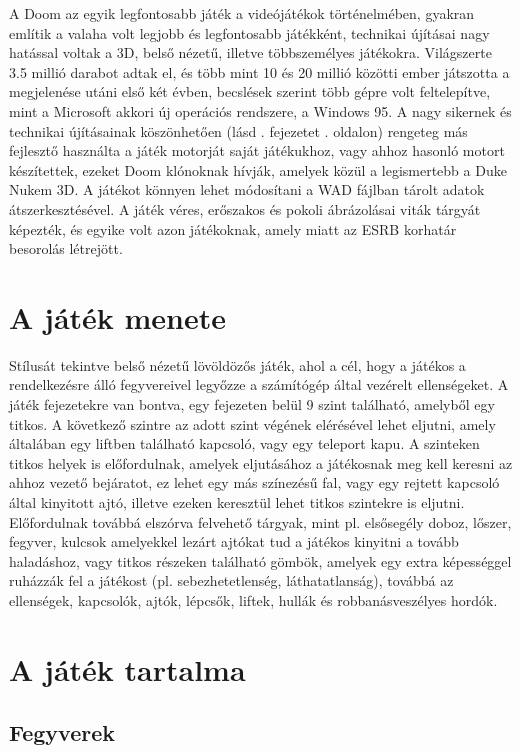 \documentclass{thesis-ekf}
\theoremstyle{definition}
\theoremstyle{remark}
\begin{document}
A Doom az egyik legfontosabb játék a videójátékok történelmében, gyakran említik
a valaha volt legjobb és legfontosabb játékként, technikai újításai nagy
hatással voltak a 3D, belső nézetű, illetve többszemélyes játékokra. Világszerte
3.5 millió darabot adtak el, és több mint 10 és 20 millió közötti ember
játszotta a megjelenése utáni első két évben, becslések szerint több gépre volt
feltelepítve, mint a Microsoft akkori új operációs rendszere, a Windows 95. A
nagy sikernek és technikai újításainak köszönhetően (lásd .
fejezetet . oldalon) rengeteg más fejlesztő használta a
játék motorját saját játékukhoz, vagy ahhoz hasonló motort készítettek, ezeket
Doom klónoknak hívják, amelyek közül a legismertebb a Duke Nukem 3D. A játékot
könnyen lehet módosítani a WAD fájlban tárolt adatok átszerkesztésével. A játék
véres, erőszakos és pokoli ábrázolásai viták tárgyát képezték, és egyike volt
azon játékoknak, amely miatt az ESRB korhatár besorolás létrejött.

\section{A játék menete}

Stílusát tekintve belső nézetű lövöldözős játék, ahol a cél, hogy a játékos a
rendelkezésre álló fegyvereivel legyőzze a számítógép által vezérelt
ellenségeket. A játék fejezetekre van bontva, egy fejezeten belül 9 szint
található, amelyből egy titkos. A következő szintre az adott szint végének
elérésével lehet eljutni, amely általában egy liftben található kapcsoló, vagy
egy teleport kapu. A szinteken titkos helyek is előfordulnak, amelyek
eljutásához a játékosnak meg kell keresni az ahhoz vezető bejáratot, ez lehet
egy más színezésű fal, vagy egy rejtett kapcsoló által kinyitott ajtó, illetve
ezeken keresztül lehet titkos szintekre is eljutni. Előfordulnak továbbá
elszórva felvehető tárgyak, mint pl. elsősegély doboz, lőszer, fegyver, kulcsok
amelyekkel lezárt ajtókat tud a játékos kinyitni a tovább haladáshoz, vagy
titkos részeken található gömbök, amelyek egy extra képességgel ruházzák fel a
játékost (pl. sebezhetetlenség, láthatatlanság), továbbá az ellenségek,
kapcsolók, ajtók, lépcsők, liftek, hullák és robbanásveszélyes hordók.

\section{A játék tartalma}

\subsection{Fegyverek}
\end{document}
